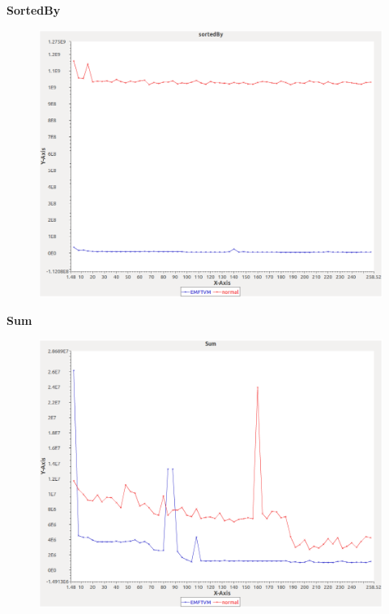 \noindent\textbf{SortedBy}

\begin{figure}[h]
\centering
\includegraphics[width=\textwidth]{../graphs/set/sortedBy}
\end{figure}
\pagebreak

\noindent\textbf{Sum}

\begin{figure}[h]
\centering
\includegraphics[width=\textwidth]{../graphs/set/Sum}
\end{figure}
\pagebreak

